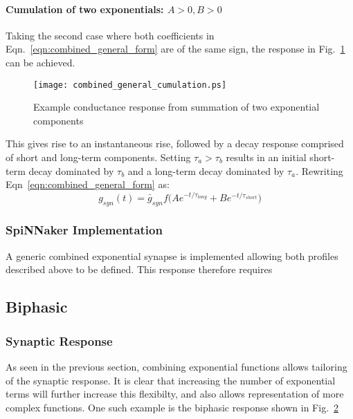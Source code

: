 \documentclass[12pt]{article}
\begin{document}
\paragraph{Cumulation of two exponentials: $A>0, B>0$ \\}
\noindent Taking the second case where both coefficients in
Eqn.~\ref{eqn:combined_general_form} are of the same sign, the response in
Fig.~\ref{fig:combined_exp_example} can be achieved.
 \begin{figure}[!h]
\begin{centering}
\texttt{[image: combined\_general\_cumulation.ps]}
\caption{Example conductance response from summation of two exponential
components}
\label{fig:combined_exp_example}
\end{centering}
\end{figure}
This gives rise to an instantaneous rise, followed by a decay
response comprised of short and long-term components. Setting $\tau_a > \tau_b$
results in an initial short-term decay dominated by $\tau_b$ and a long-term
decay dominated by $\tau_a$. Rewriting Eqn~\ref{eqn:combined_general_form} as:
\begin{equation}
g_{syn}(t)=\bar{g}_{syn}f\Big(Ae^{-t / \tau_{long}} + Be^{-t /
\tau_{short}}\Big)
\label{eqn:combined_exponential_cumulation_response}
\end{equation}

\subsubsection*{SpiNNaker Implementation}
A generic combined exponential synapse is implemented allowing both profiles
described above to be defined. This response therefore requires


\subsection{Biphasic}
\subsubsection*{Synaptic Response}
As seen in the previous section, combining exponential functions allows
tailoring of the synaptic response. It is clear that increasing the number of
exponential terms will further increase this flexibilty, and also allows
representation of more complex functions. One such example is the biphasic
response shown in Fig.~\ref{fig:biphasic_response}
\begin{figure}
\begin{centering}
\label{fig:biphasic_response}
\end{centering}
\end{figure}
\end{document}
